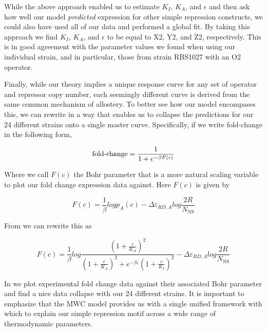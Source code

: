 While the above approach enabled us to estimate $K_I$, $K_A$, and $\epsilon$ and then ask how well our model \textit{predicted} expression for other simple repression constructs, we could also have used all of our data and performed a global fit. By taking this approach we find $K_I$, $K_A$, and $\epsilon$ to be equal to X2, Y2, and Z2, respectively. This is in good agreement with the parameter values we found when using our individual strain, and in particular, those from strain RBS1027 with an O2 operator.

 Finally, while our theory implies a unique response curve for any set of operator and repressor copy number, each seemingly different curve is derived from the same common mechanism of allostery. To better see how our model encompases this, we can rewrite \eref[eq7] in a way that enables us to collapse the predictions for our 24 different strains onto a single master curve. Specifically, if we write fold-change in the following form,

\begin{equation}\label{eq8}
\operatorname{fold-change}= \frac{1}{1+e^{-\beta F(c)}}
\end{equation}

Where we call $F(c)$ the Bohr parameter \cite{Phillips2016} that is a more natural scaling variable to plot our fold change expression data against. Here $F(c)$ is given by

\begin{equation}\label{eq9}
F(c) =  \frac{1}{\beta} log p_A(c)
- \Delta\varepsilon_{RD,A}
log \frac{2R}{N_{\text{NS}}}
\end{equation}

From \eref[eq6v2] we can rewrite this as

\begin{equation}\label{eq10}
F(c) = \frac{1}{\beta} log \frac{\left(1+\frac{c}{K_A}\right)^2}{\left(1+\frac{c}{K_A}\right)^2+e^{-\beta  \varepsilon }\left(1+\frac{c}{K_I}\right)^2} - \Delta\varepsilon_{RD,A} log \frac{2R}{N_{\text{NS}}}
\end{equation}

In  we plot experimental fold change data against their associated Bohr parameter and find a nice data collapse with our 24 different strains. It is important to emphasize that the MWC model provides us with a single unified framework with which to explain our simple repression motif across a wide range of thermodynamic parameters.

